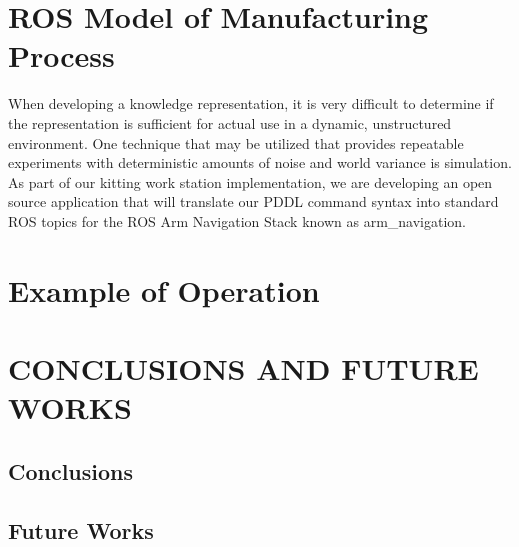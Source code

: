 \documentclass[a4paper, 10pt, conference]{ieeeconf}      %
\begin{document}
\section{ROS Model of Manufacturing Process}
\label{sect:ROS}
When developing a knowledge representation, it is very difficult to determine if the representation is sufficient for actual use in a dynamic, unstructured environment.
One technique that may be utilized that provides repeatable experiments with deterministic amounts of noise and world variance is simulation. As part of our kitting work
station implementation, we are developing an open source application that will translate our PDDL command syntax into standard ROS topics for the ROS Arm Navigation
Stack known as arm\_navigation.

\section{Example of Operation}
\label{sect:Example}




\section{CONCLUSIONS AND FUTURE WORKS}
\label{sect:Conclusions}

\subsection{Conclusions}




\subsection{Future Works}



\end{document}
